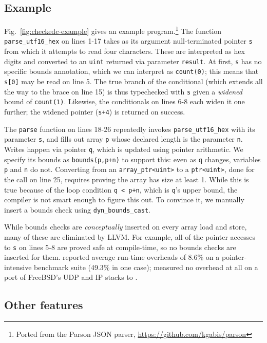 \documentclass[conference]{IEEEtran}
\newcommand{\code}[1]{\lstinline|#1|}
\newcommand{\checkedc}{\text{Checked C}\xspace}
\begin{document}
\subsection{Example}

Fig.~\ref{fig:checkedc-example} gives an example \checkedc
program.\footnote{Ported from the Parson JSON
parser, \url{https://github.com/kgabis/parson}} 
The function \code{parse_utf16_hex} on lines 1-17 takes as its argument
null-terminated pointer \code{s} from which it attempts to read four
characters. These are interpreted as hex digits and converted to an
\code{uint} returned via parameter \code{result}. At first,
\code{s} has no specific bounds annotation, which we can interpret as
\code{count(0)}; this means that \code{s[0]} may be read on line
5. The true branch of the conditional (which extends all the way to
the brace on line 15) is thus typechecked with \code{s} given a
\emph{widened} bound of \code{count(1)}. Likewise, the conditionals on
lines 6-8 each widen it one further; the widened pointer
(\code{s+4}) is returned on success.

The \code{parse} function on lines 18-26 repeatedly invokes
\code{parse_utf16_hex} with its parameter \code{s}, and fills out
array \code{p} whose declared length is the parameter \code{n}. Writes
happen via pointer \code{q}, which is updated using pointer
arithmetic. We specify its bounds as
\code{bounds(p,p+n)} to support this: even as \code{q} changes, 
variables \code{p} and \code{n} do not. Converting from an
\code{array_ptr<uint>} to a \code{ptr<uint>}, done for the call on
line 25, requires proving the array has size at least 1. While this is true
because of the loop condition \code{q < p+n}, which is \code{q}'s
upper bound, the compiler is not smart enough to figure this
out. To convince it, we manually insert a bounds check using
\code{dyn_bounds_cast}.

While bounds checks are \emph{conceptually} inserted on every array
load and store, many of these are eliminated by LLVM\@. For example,
all of the pointer accesses to \code{s} on lines 5-8 are proved safe
at compile-time, so no bounds checks are inserted for
them. \citet{Elliott2018}
reported average run-time overheads of 8.6\% on a pointer-intensive
benchmark suite (49.3\% in one case); \citet{duanrefactoring} measured
no overhead at all on a port of FreeBSD's UDP and IP stacks to \checkedc.



\subsection{Other features}
\end{document}
